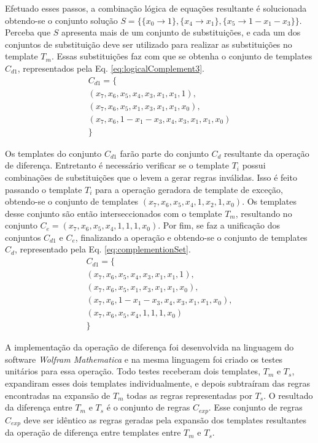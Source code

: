 Efetuado esses passos, a combinação lógica de equações resultante é solucionada obtendo-se o conjunto solução $S = \{\{x_0 \to 1\}, \{x_4 \to x_1\}, \{x_5 \to 1 - x_1 - x_3\}\}$. Perceba que $S$ apresenta mais de um conjunto de substituições, e cada um dos conjuntos de substituição deve ser utilizado para realizar as substituições no template $T_m$. Essas substituições faz com que se obtenha o conjunto de templates $C_{d1}$, representados pela Eq. \eqref{eq:logicalComplement3}. 
\begin{equation}
\begin{split}
C_{d1} = \{\\(x_7, x_6, x_5, x_4, x_3, x_1, x_1, 1), \\(x_7, x_6, x_5, x_1, x_3, x_1, x_1, x_0), \\(x_7, x_6, 1 - x_1 - x_3, x_4, x_3, x_1, x_1, x_0)\\\}
\end{split}
\label{eq:logicalComplement3}
\end{equation}

Os templates do conjunto $C_{d1}$ farão parte do conjunto $C_d$ resultante da operação de diferença. Entretanto é necessário verificar se o template $T_i$ possui combinações de substituições que o levem a gerar regras inválidas. Isso é feito passando o template $T_i$ para a operação geradora de template de exceção, obtendo-se o conjunto de templates ${(x_7, x_6, x_5, x_4, 1, x_2, 1, x_0)}$. Os templates desse conjunto são então interseccionados com o template $T_m$, resultando no conjunto $C_e = {(x_7, x_6, x_5, x_4, 1, 1, 1, x_0)}$. Por fim, se faz a unificação dos conjuntos $C_{d1}$ e $C_e$, finalizando a operação e obtendo-se o conjunto de templates $C_d$, representado pela Eq. \ref{eq:complementionSet}.
\begin{equation}
\begin{split}
C_{d1} = \{\\(x_7, x_6, x_5, x_4, x_3, x_1, x_1, 1), \\(x_7, x_6, x_5, x_1, x_3, x_1, x_1, x_0), \\(x_7, x_6, 1 - x_1 - x_3, x_4, x_3, x_1, x_1, x_0), \\(x_7, x_6, x_5, x_4, 1, 1, 1, x_0)\\\}
\label{eq:complementionSet}
\end{split}
\end{equation}

A implementação da operação de diferença foi desenvolvida na linguagem do software \textit{Wolfram Mathematica} \cite{woframMathematica10} e na mesma linguagem foi criado os testes unitários para essa operação. Todo testes receberam dois templates, $T_m$ e $T_s$, expandiram esses dois templates individualmente, e depois subtraíram das regras encontradas na expansão de $T_m$ todas as regras representadas por $T_s$. O resultado da diferença entre $T_m$ e $T_s$ é o conjunto de regras $C_{exp}$. Esse conjunto de regras $C_{exp}$ deve ser idêntico as regras geradas pela expansão dos templates resultantes da operação de diferença entre templates entre $T_m$ e $T_s$.

